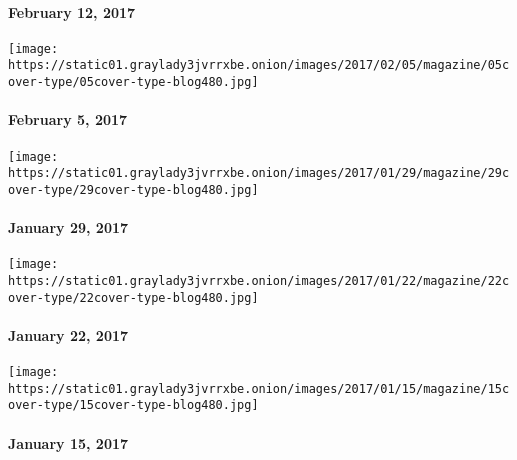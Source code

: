 \hypertarget{february-12-2017}{%
\paragraph{February 12, 2017}\label{february-12-2017}}

\href{http://www.nytimes3xbfgragh.onion/issue/magazine/2017/02/05/magazine-index}{}

\texttt{[image: https://static01.graylady3jvrrxbe.onion/images/2017/02/05/magazine/05cover-type/05cover-type-blog480.jpg]}

\hypertarget{february-5-2017}{%
\paragraph{February 5, 2017}\label{february-5-2017}}

\href{http://www.nytimes3xbfgragh.onion/issue/magazine/2017/01/27/12917-issue-20170129}{}

\texttt{[image: https://static01.graylady3jvrrxbe.onion/images/2017/01/29/magazine/29cover-type/29cover-type-blog480.jpg]}

\hypertarget{january-29-2017}{%
\paragraph{January 29, 2017}\label{january-29-2017}}

\href{http://www.nytimes3xbfgragh.onion/issue/magazine/2017/01/22/magazine-index}{}

\texttt{[image: https://static01.graylady3jvrrxbe.onion/images/2017/01/22/magazine/22cover-type/22cover-type-blog480.jpg]}

\hypertarget{january-22-2017}{%
\paragraph{January 22, 2017}\label{january-22-2017}}

\href{http://www.nytimes3xbfgragh.onion/issue/magazine/2017/01/15/magazine-index}{}

\texttt{[image: https://static01.graylady3jvrrxbe.onion/images/2017/01/15/magazine/15cover-type/15cover-type-blog480.jpg]}

\hypertarget{january-15-2017}{%
\paragraph{January 15, 2017}\label{january-15-2017}}

\href{http://www.nytimes3xbfgragh.onion/issue/magazine/2017/01/08/magazine-index-2}{}

